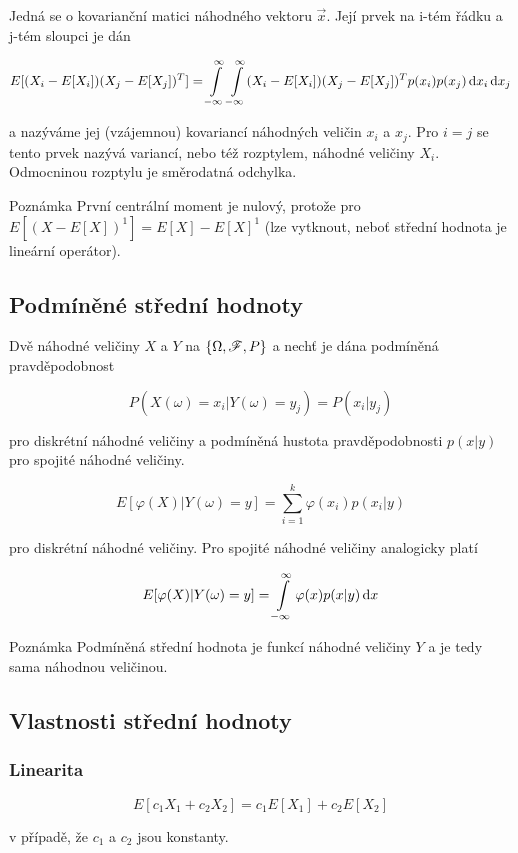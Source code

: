 Jedná se o kovarianční matici náhodného vektoru $\vec{x}$. Její prvek na i-tém řádku a j-tém sloupci je dán

\[ E[(X_i-E[X_i])(X_j-E[X_j])^T]= \int\limits_{-\infty}^{\infty}\int\limits_{-\infty}^{\infty} (X_i-E[X_i])(X_j-E[X_j])^T p(x_i)p(x_j)\,\mathrm{d} x_i\,\mathrm{d} x_j\]

a nazýváme jej (vzájemnou) kovariancí náhodných veličin $x_i$ a $x_j$. Pro $i=j$ se tento prvek nazývá variancí, nebo též rozptylem, náhodné veličiny $X_i$. Odmocninou rozptylu je směrodatná odchylka.

\begin{note}{Poznámka}
První centrální moment je nulový, protože pro $E[(X-E[X])^1]=E[X]-E[X]^1$ (lze vytknout, neboť střední hodnota je lineární operátor).
\end{note}

\subsection{Podmíněné střední hodnoty}
Dvě náhodné veličiny $X$ a $Y$ na $\left\{\Omega,\mathscr{F},P\right\}$ a nechť je dána podmíněná pravděpodobnost

\[ P(X(\omega)=x_i | Y(\omega)=y_j)=P(x_i|y_j) \]

pro diskrétní náhodné veličiny a podmíněná hustota pravděpodobnosti $p(x|y)$ pro spojité náhodné veličiny.

\[ E[\varphi(X)|Y(\omega)=y]=\sum_{i=1}^k \varphi(x_i)p(x_i|y) \]

pro diskrétní náhodné veličiny. Pro spojité náhodné veličiny analogicky platí

\[ E[\varphi(X)|Y(\omega)=y]=\int\limits_{-\infty}^\infty \varphi(x)p(x|y)\,\mathrm{d} x \]

\begin{note}{Poznámka}
Podmíněná střední hodnota je funkcí náhodné veličiny $Y$ a je tedy sama náhodnou veličinou.
\end{note}

\subsection{Vlastnosti střední hodnoty}
\subsubsection{Linearita}
\[ E[c_1X_1 + c_2X_2] = c_1E[X_1] + c_2E[X_2] \]

v případě, že $c_1$ a $c_2$ jsou konstanty.

